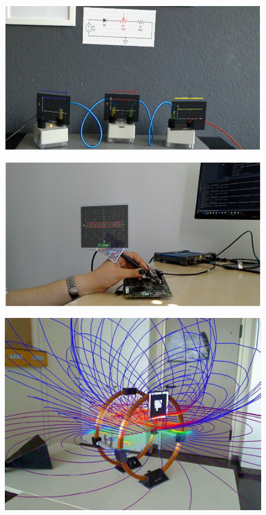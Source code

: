 \begin{figure}[h!]
	\centering
	\includegraphics[width=1\textwidth]{images/Amiraslanov18.png}
	\caption{\cite{Amiraslanov18}}
	\label{img:Amiraslanov18}
\end{figure}

\begin{figure}[h!]
	\centering
	\includegraphics[width=1\textwidth]{images/Javaheri18.png}
	\caption{\cite{Javaheri18}}
	\label{img:Javaheri18}
\end{figure}

\begin{figure}[h!]
	\centering
	\includegraphics[width=1\textwidth]{images/Buchau09.jpg}
	\caption{\cite{Buchau09}}
	\label{img:Buchau09}
\end{figure}


